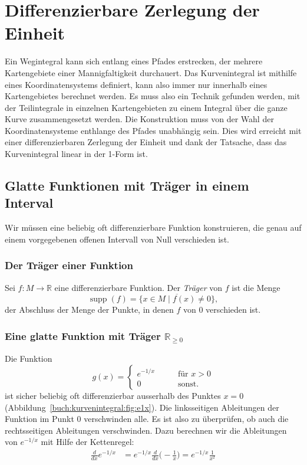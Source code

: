 %
%
\section{Differenzierbare Zerlegung der Einheit
\label{buch:kurvenintegral:section:zerlegung}}
Ein Wegintegral kann sich entlang eines Pfades erstrecken, der
mehrere Kartengebiete einer Mannigfaltigkeit durchauert.
Das Kurvenintegral ist mithilfe eines Koordinatensystems definiert,
kann also immer nur innerhalb eines Kartengebietes berechnet werden.
Es muss also ein Technik gefunden werden, mit der Teilintegrale in
einzelnen Kartengebieten zu einem Integral über die ganze Kurve
zusammengesetzt werden.
Die Konstruktion muss von der Wahl der Koordinatensysteme enthlange
des Pfades unabhängig sein.
Dies wird erreicht mit einer differenzierbaren Zerlegung der Einheit
und dank der Tatsache, dass das Kurvenintegral linear in der 1-Form
ist.

%
%
\subsection{Glatte Funktionen mit Träger in einem Interval}
Wir müssen eine beliebig oft differenzierbare Funktion konstruieren,
die genau auf einem vorgegebenen offenen Intervall von Null
verschieden ist.

%
%
\subsubsection{Der Träger einer Funktion}

\begin{definition}
Sei $f\colon M\to\mathbb{R}$ eine differenzierbare Funktion.
Der {\em Träger} von $f$ ist die Menge
%
\[
\operatorname{supp}(f)
=
\overline{
\{x\in M\mid f(x)\ne 0\}
},
\]
der Abschluss der Menge der Punkte, in denen $f$ von $0$ verschieden
ist.
\end{definition}

%
%
\subsubsection{Eine glatte Funktion mit Träger $\mathbb{R}_{\ge 0}$}
%
Die Funktion
\[
g(x)
=
\begin{cases}
e^{-1/x}&\qquad \text{für $x>0$}\\
0       &\qquad \text{sonst.}
\end{cases}
\]
ist sicher beliebig oft differenzierbar ausserhalb des Punktes $x=0$
(Abbildung~\ref{buch:kurvenintegral:fig:e1x}).
Die linksseitigen Ableitungen der Funktion im Punkt $0$ verschwinden
alle.
Es ist also zu überprüfen, ob auch die rechtsseitigen Ableitungen
verschwinden.
Dazu berechnen wir die Ableitungen von $e^{-1/x}$ mit Hilfe der
Kettenregel:
\begin{align*}
\frac{d}{dx}e^{-1/x}
&=
e^{-1/x}\frac{d}{dx}\biggl(-\frac1x\biggr)
=
e^{-1/x}\frac{1}{x^2}
\\
\end{align*}

